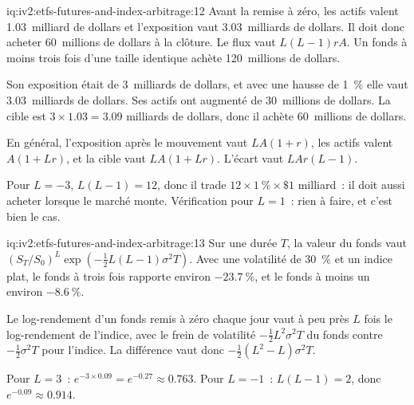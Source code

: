 \begin{solution}{iq:iv2:etfs-futures-and-index-arbitrage:12}
Avant la remise à zéro, les actifs valent 1.03~milliard de dollars et l'exposition vaut 3.03~milliards de dollars. Il doit donc acheter 60~millions de dollars à la clôture. Le flux vaut $L(L - 1)rA$. Un fonds à moins trois fois d'une taille identique achète 120~millions de dollars.

Son exposition était de 3~milliards de dollars, et avec une hausse de 1~\% elle vaut 3.03~milliards de dollars. Ses actifs ont augmenté de 30~millions de dollars. La cible est $3 \times 1.03 = 3.09$ milliards de dollars, donc il achète 60~millions de dollars.

En général, l'exposition après le mouvement vaut $LA(1 + r)$, les actifs valent $A(1 + Lr)$, et la cible vaut $LA(1 + Lr)$. L'écart vaut $LAr(L - 1)$.

Pour $L = -3$, $L(L - 1) = 12$, donc il trade $12 \times 1~\% \times \$1$ milliard~: il doit aussi acheter lorsque le marché monte. Vérification pour $L = 1$~: rien à faire, et c'est bien le cas.

\end{solution}

\begin{solution}{iq:iv2:etfs-futures-and-index-arbitrage:13}
Sur une durée $T$, la valeur du fonds vaut $(S_T/S_0)^L\exp\left(-\tfrac12L(L - 1)\sigma^2T\right)$. Avec une volatilité de 30~\% et un indice plat, le fonds à trois fois rapporte environ $-23.7~\%$, et le fonds à moins un environ $-8.6~\%$.

Le log-rendement d'un fonds remis à zéro chaque jour vaut à peu près $L$ fois le log-rendement de l'indice, avec le frein de volatilité $-\tfrac12L^2\sigma^2T$ du fonds contre $-\tfrac12\sigma^2T$ pour l'indice. La différence vaut donc $-\tfrac12(L^2 - L)\sigma^2T$.

Pour $L = 3$~: $e^{-3 \times 0.09} = e^{-0.27} \approx 0.763$. Pour $L = -1$~: $L(L - 1) = 2$, donc $e^{-0.09} \approx 0.914$.

\end{solution}

